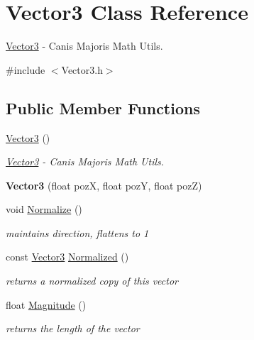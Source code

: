 \hypertarget{class_vector3}{\section{Vector3 Class Reference}
\label{class_vector3}
}


\hyperlink{class_vector3}{Vector3} -\/ Canis Majoris Math Utils.  




{\ttfamily \#include $<$Vector3.\+h$>$}

\subsection*{Public Member Functions}
\begin{DoxyCompactItemize}
\item 
\hyperlink{class_vector3_a0f49191f7e001e7f7ae1cb49522118b4}{Vector3} ()
\begin{DoxyCompactList}\small\item\em \hyperlink{class_vector3}{Vector3} -\/ Canis Majoris Math Utils. \end{DoxyCompactList}\item 
\hypertarget{class_vector3_a79e51c3fab6846f6a45ce53956a32711}{{\bfseries Vector3} (float poz\+X, float poz\+Y, float poz\+Z)}\label{class_vector3_a79e51c3fab6846f6a45ce53956a32711}

\item 
\hypertarget{class_vector3_a9c94cc16049543fc8edaba52c2b266b7}{void \hyperlink{class_vector3_a9c94cc16049543fc8edaba52c2b266b7}{Normalize} ()}\label{class_vector3_a9c94cc16049543fc8edaba52c2b266b7}

\begin{DoxyCompactList}\small\item\em maintains direction, flattens to 1 \end{DoxyCompactList}\item 
\hypertarget{class_vector3_ad77aca718d6849b1a184be983ecc7c22}{const \hyperlink{class_vector3}{Vector3} \hyperlink{class_vector3_ad77aca718d6849b1a184be983ecc7c22}{Normalized} ()}\label{class_vector3_ad77aca718d6849b1a184be983ecc7c22}

\begin{DoxyCompactList}\small\item\em returns a normalized copy of this vector \end{DoxyCompactList}\item 
\hypertarget{class_vector3_a5721d97b9640951b58c40de1a893f966}{float \hyperlink{class_vector3_a5721d97b9640951b58c40de1a893f966}{Magnitude} ()}\label{class_vector3_a5721d97b9640951b58c40de1a893f966}

\begin{DoxyCompactList}\small\item\em returns the length of the vector \end{DoxyCompactList}\end{DoxyCompactItemize}
